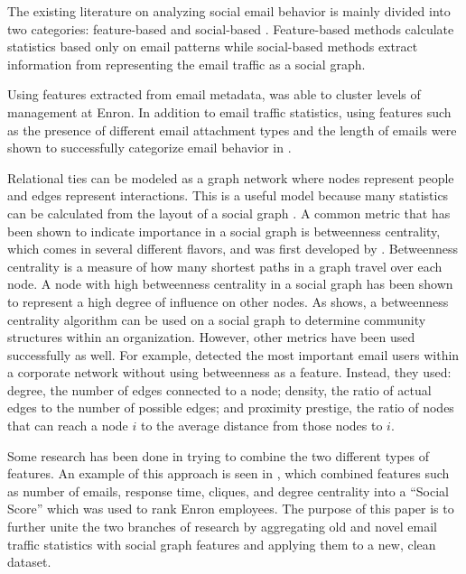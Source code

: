 \documentclass{article}
\begin{document}
The existing literature on analyzing social email behavior is mainly divided into two categories: feature-based and social-based \cite{tang_email_2013}.  Feature-based methods calculate statistics based only on email patterns while social-based methods extract information from representing the email traffic as a social graph.

Using features extracted from email metadata, \cite{yelupula_social_2008} was able to cluster levels of management at Enron. In addition to email traffic statistics, using features such as the presence of different email attachment types and the length of emails were shown to successfully categorize email behavior in \cite{martin_analyzing_2005}.

Relational ties can be modeled as a graph network where nodes represent people and edges represent interactions.  This is a useful model because many statistics can be calculated from the layout of a social graph \cite{wasserman_social_1994}.  A common metric that has been shown to indicate importance in a social graph is betweenness centrality, which comes in several different flavors, and was first developed by \cite{freeman_set_1977}.  Betweenness centrality is a measure of how many shortest paths in a graph travel over each node.  A node with high betweenness centrality in a social graph has been shown to represent a high degree of influence on other nodes.  As \cite{tyler_email_2003} shows, a betweenness centrality algorithm can be used on a social graph to determine community structures within an organization.  However, other metrics have been used successfully as well.  For example, \cite{wilson_discovery_2009} detected the most important email users within a corporate network without using betweenness as a feature.  Instead, they used: degree, the number of edges connected to a node; density, the ratio of actual edges to the number of possible edges; and proximity prestige, the ratio of nodes that can reach a node $i$ to the average distance from those nodes to $i$.

Some research has been done in trying to combine the two different types of features.  An example of this approach is seen in \cite{rowe_automated_2007}, which combined features such as number of emails, response time, cliques, and degree centrality into a ``Social Score'' which was used to rank Enron employees.  The purpose of this paper is to further unite the two branches of research by aggregating old and novel email traffic statistics with social graph features and applying them to a new, clean dataset.
\end{document}
